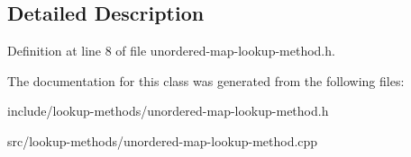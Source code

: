 \subsection{Detailed Description}


Definition at line 8 of file unordered-\/map-\/lookup-\/method.\+h.



The documentation for this class was generated from the following files\+:\begin{DoxyCompactItemize}
\item 
include/lookup-\/methods/unordered-\/map-\/lookup-\/method.\+h\item 
src/lookup-\/methods/unordered-\/map-\/lookup-\/method.\+cpp\end{DoxyCompactItemize}
